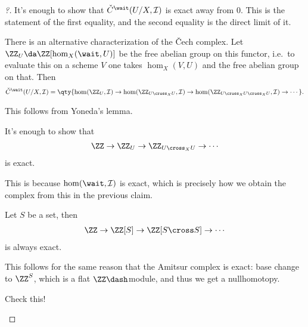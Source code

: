 \begin{proof}[?]

It's enough to show that \(\check{C}^\wait(U/X, \mathcal{I})\) is exact
away from 0. This is the statement of the first equality, and the second
equality is the direct limit of it.

\begin{claim}[1]

There is an alternative characterization of the Čech complex. Let
\(\ZZ_U \da \ZZ[\hom_X(\wait, U)]\) be the free abelian group on this
functor, i.e.~to evaluate this on a scheme \(V\) one takes
\(\hom_X(V, U)\) and the free abelian group on that. Then
\begin{align*}  
\check{C}^\wait(U/X, \mathcal{I}) = \qty{ \hom(\ZZ_U, \mathcal{I}) \to \hom(\ZZ_{U\cross_X U}, \mathcal{I}) \to \hom(\ZZ_{U\cross_X U \cross_X U}, \mathcal{I}) \to \cdots}
.\end{align*}

\end{claim}

This follows from Yoneda's lemma.

\begin{claim}[2]

It's enough to show that
\begin{align*}  
\ZZ \to \ZZ_{U} \to \ZZ_{U\cross_X U} \to \cdots
\end{align*} is exact.

\end{claim}

This is because \(\hom(\wait, \mathcal{I})\) is exact, which is
precisely how we obtain the complex from this in the previous claim.

\begin{claim}[3]

Let \(S\) be a set, then
\begin{align*}  
\ZZ \to \ZZ[S] \to \ZZ[S\cross S] \to \cdots
\end{align*} is always exact.

\end{claim}

This follows for the same reason that the Amitsur complex is exact: base
change to \(\ZZ^S\), which is a flat \(\ZZ\dash\)module, and thus we get
a nullhomotopy.

\begin{exercise}[?]

Check this!

\end{exercise}

\end{proof}

